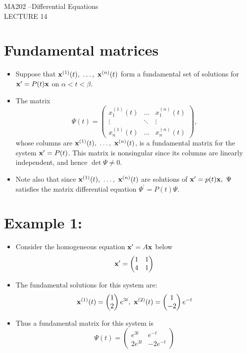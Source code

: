 \documentclass[11pt,a4paper]{article}
\begin{document}
	\begin{center}
		\vspace*{8cm}
		\Huge MA202 –Differential Equations\\
		\LARGE LECTURE 14
  \end{center}
  \newpage
	\section*{Fundamental matrices}
	\begin{itemize}
		\item Suppose that $\vb{x}^{(1)}(t),\ \ldots,\ \vb{x}^{(n)}(t)$ form a fundamental set of solutions for $\vb{x}^\prime = P(t)\vb{x}$ on $\alpha < t <\beta$.
		\item The matrix
		$$
		\Psi (t)=
		\begin{pmatrix}
			x_1^{(1)}(t) & \ldots & x_1^{(n)}(t)\\
			\vdots & \ddots & \vdots\\
			x_n^{(1)}(t) & \ldots & x_n^{(n)}(t)
		\end{pmatrix},
		$$
		whose columns are $\vb{x}^{(1)}(t),\ \ldots,\ \vb{x}^{(n)}(t)$, is a fundamental matrix for the system $\vb{x}^\prime = P(t)$. This matrix is nonsingular since its columns are linearly independent, and hence $\det \Psi \neq 0$.
		\item Note also that since $\vb{x}^{(1)}(t),\ \ldots,\ \vb{x}^{(n)}(t)$ are solutions of $\vb{x}^\prime = p(t)\vb{x},\ \Psi$ satisfies the matrix differential equation $\Psi ^\prime = P(t)\Psi$.
	\end{itemize}
	\section*{Example 1:}
	\begin{itemize}
		\item Consider the homogeneous equation $\vb{x}^\prime = A\vb{x}$ below
		$$
		\vb{x}^\prime =
		\begin{pmatrix}
			1 & 1\\
			4 & 1
		\end{pmatrix}
		$$
		\item The fundamental solutions for this system are:
		$$
		\vb{x}^{(1)}(t) =
		\begin{pmatrix}
			1\\
			2
		\end{pmatrix}e^{3t},\ 
		\vb{x}^{(2)}(t) =
		\begin{pmatrix}
			1\\
			-2
		\end{pmatrix}e^{-t}
		$$
		\item Thus a fundamental matrix for this system is
		$$
		\Psi(t) =
		\begin{pmatrix}
			e^{3t} & e^{-t}\\
			2e^{3t} & -2e^{-t}
		\end{pmatrix}
		$$
	\end{itemize}
\end{document}
